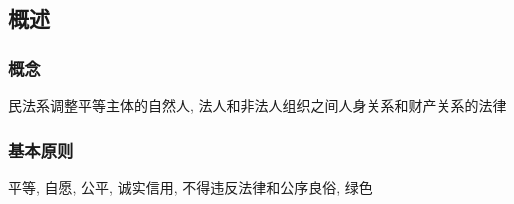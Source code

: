 \subsection{概述}

\subsubsection{概念} 民法系调整平等主体的自然人, 法人和非法人组织之间人身关系和财产关系的法律

\subsubsection{基本原则} 平等, 自愿, 公平, 诚实信用, 不得违反法律和公序良俗, 绿色